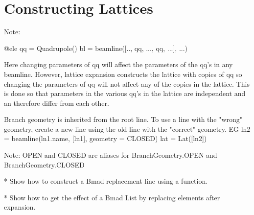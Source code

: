\chapter{Constructing Lattices}
\label{c:construct-lat}

Note: 
\begin{example}
  @ele qq = Quadrupole()
  bl = beamline([.., qq, ..., qq, ...], ...)
\end{example}
Here changing parameters of qq will affect the parameters of the qq's in any beamline.
However, lattice expansion constructs the lattice with copies of qq so changing the
parameters of qq will not affect any of the copies in the lattice. This is done so that
parameters in the various qq's in the lattice are independent and an therefore differ from each
other. 

Branch geometry is inherited from the root line. To use a line with the "wrong" geometry, create
a new line using the old line with the "correct" geometry. EG
  ln2 = beamline(ln1.name, [ln1], geometry = CLOSED)
  lat = Lat([ln2])

Note: OPEN and CLOSED are aliases for BranchGeometry.OPEN and BranchGeometry.CLOSED

* Show how to construct a Bmad replacement line using a function.

* Show how to get the effect of a Bmad List by replacing elements after expansion.